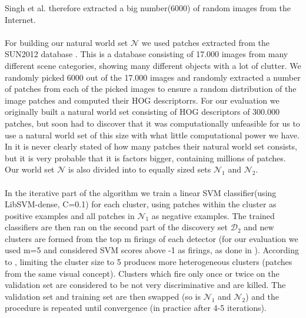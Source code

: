 Singh et al. therefore extracted a big number(6000) of random images from the Internet.\\
\\
For building our natural world set $\mathcal{N}$ we used patches extracted from the SUN2012 database \cite{SUN2010}.
This is a database consisting of 17.000 images from many different scene categories, showing many different objects with a lot of clutter.
We randomly picked 6000 out of the 17.000 images and randomly extracted a number of patches from each of the picked images to
ensure a random distribution of the image patches and computed their HOG descriptorrs. For our evaluation we originally
built a natural world set consisting of HOG descriptors of 300.000 patches, but soon had to discover that it was computationally unfeasible for us
to use a natural world set of this size with what little computational power we have. In \cite{Singh2012DiscPat} it is never clearly stated of how 
many patches their natural world set consists, but it is very probable that it is factors bigger, containing millions of patches.
Our world set $\mathcal{N}$ is also divided into to equally sized sets $\mathcal{N}_1$ and $\mathcal{N}_2$.\\
\\
In the iterative part of the algorithm we train a linear SVM classifier(using LibSVM-dense, C=0.1) for each cluster, using patches within
the cluster as positive examples and all patches in $\mathcal{N}_1$ as negative examples. The trained classifiers are then ran on the second part 
of the discovery set $\mathcal{D}_2$ and new clusters are formed from the top m firings of each detector (for our evaluation we used
m=5 and considered SVM scores above -1 as firings, as done in \cite{Singh2012DiscPat}). According to \cite{Singh2012DiscPat},
limiting the cluster size to 5 produces more heterogeneous clusters (patches from the same visual concept). Clusters which fire
only once or twice on the validation set are considered to be not very discriminative and are killed. The validation set and training
set are then swapped (so is $\mathcal{N}_1$ and $\mathcal{N}_2$) and the procedure is repeated until convergence (in practice after 4-5 iterations).


